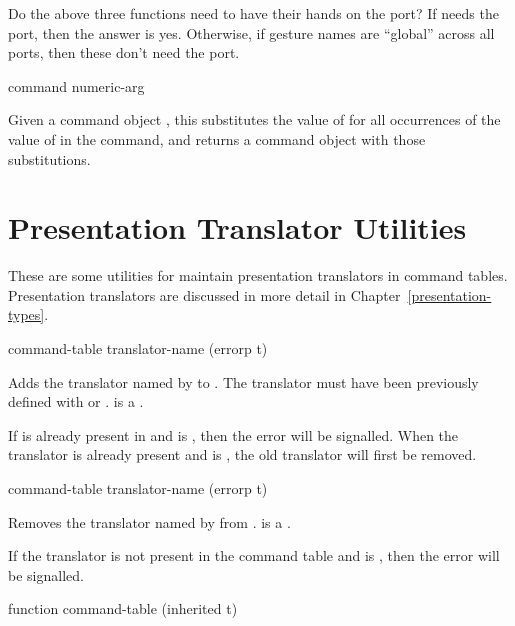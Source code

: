  {Do the above three functions need to have their hands on the port?
If  needs the port, then the answer is yes.
Otherwise, if gesture names are ``global'' across all ports, then these don't
need the port.}

 {command numeric-arg}

Given a command object , this substitutes the value of
 for all occurrences of the value of
 in the command, and returns a command object
with those substitutions.


\section {Presentation Translator Utilities}

These are some utilities for maintain presentation translators in
command tables.  Presentation translators are discussed in more detail
in Chapter~\ref{presentation-types}.


 {command-table translator-name
                                                       \key (errorp t)}

Adds the translator named by  to .  The
translator must have been previously defined with 
or .   is a
.

If  is already present in  and
 is , then the  error will be
signalled.  When the translator is already present and  is
, the old translator will first be removed.


 {command-table translator-name
                                                            \key (errorp t)}

Removes the translator named by  from .
 is a .

If the translator is not present in the command table and  is
, then the  error will be signalled.


 {function command-table \key (inherited t)}

